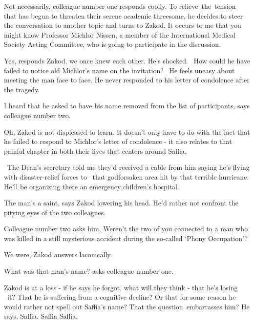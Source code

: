 \documentclass[letterpaper]{article}
\begin{document}
{\textquotedbl}Not necessarily,{\textquotedbl} colleague number one responds coolly. To relieve~the~tension that has
begun to threaten their serene academic threesome, he decides to steer the conversation to another topic and turns to
Zakod, {\textquotedbl}It occurs to me that you might know Professor Michlor Nissen, a member of the International
Medical Society Acting Committee, who is going to participate in the discussion.{\textquotedbl} 

{\textquotedbl}Yes,{\textquotedbl} responds Zakod, {\textquotedbl}we once knew each other.{\textquotedbl} He's shocked.
~How could he have failed to notice old Michlor's name on the invitation? ~He feels uneasy about meeting the man face
to face. He never responded to his letter of condolence after the tragedy. 

{\textquotedbl}I heard that he asked to have his name removed from the list of participants,{\textquotedbl} says
colleague number two. 

{\textquotedbl}Oh,{\textquotedbl} Zakod is not displeased to learn. It doesn't only have to do with the fact that he
failed to respond to Michlor's letter of condolence - it also relates to that painful chapter in both their lives that
centers around Saffia.

~{\textquotedbl}The Dean's secretary told me they'd received a cable from him saying he's flying with disaster-relief
forces to \textcolor{red}{\ }that godforsaken area hit by that terrible hurricane. He'll be organizing there an
emergency children's hospital.{\textquotedbl} 

{\textquotedbl}The man's a saint,{\textquotedbl} says Zakod lowering his head. He'd rather not confront the pitying eyes
of the two colleagues. 

Colleague number two asks him, {\textquotedbl}Weren't the two of you connected to a man who was killed in a still
mysterious accident during the so-called `Phony Occupation'?{\textquotedbl} 

{\textquotedbl}We were,{\textquotedbl} Zakod answers laconically. 

{\textquotedbl}What was that man's name?{\textquotedbl} asks colleague number one.

Zakod is at a loss - if he says he forgot, what will they think - that he's losing
\textcolor{red}{\ }it?\textcolor{red}{ }That he is suffering from a cognitive decline? Or that for some reason he would
rather not spell out Saffia's name? That the question~embarrasses him? He says, {\textquotedbl}Saffia. Saffia
Saffia.{\textquotedbl} 
\end{document}

